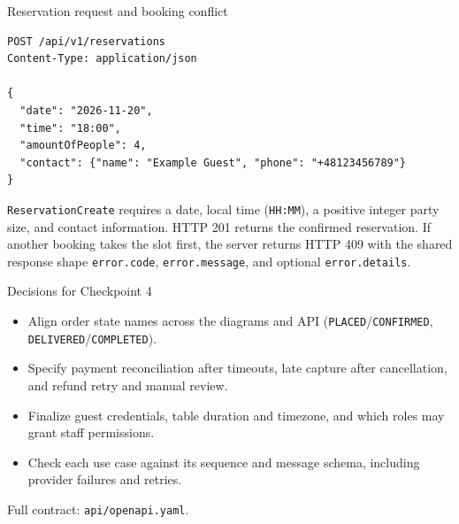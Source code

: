 \documentclass{beamer}
\begin{document}
\begin{frame}[fragile]{Reservation request and booking conflict}
\footnotesize
\begin{verbatim}
POST /api/v1/reservations
Content-Type: application/json

{
  "date": "2026-11-20",
  "time": "18:00",
  "amountOfPeople": 4,
  "contact": {"name": "Example Guest", "phone": "+48123456789"}
}
\end{verbatim}
\footnotesize
\texttt{ReservationCreate} requires a date, local time (\texttt{HH:MM}), a
positive integer party size, and contact information. HTTP 201 returns
the confirmed reservation. If another booking takes the slot first, the
server returns HTTP 409 with the shared response shape
\texttt{error.code}, \texttt{error.message}, and optional \texttt{error.details}.
\end{frame}


\begin{frame}{Decisions for Checkpoint 4}
  \begin{itemize}
    \item Align order state names across the diagrams and API
          (\texttt{PLACED}/\texttt{CONFIRMED}, \texttt{DELIVERED}/\texttt{COMPLETED}).
    \item Specify payment reconciliation after timeouts, late capture after
          cancellation, and refund retry and manual review.
    \item Finalize guest credentials, table duration and timezone, and which
          roles may grant staff permissions.
    \item Check each use case against its sequence and message schema,
          including provider failures and retries.
  \end{itemize}
  \small Full contract: \texttt{api/openapi.yaml}.
\end{frame}
\end{document}
